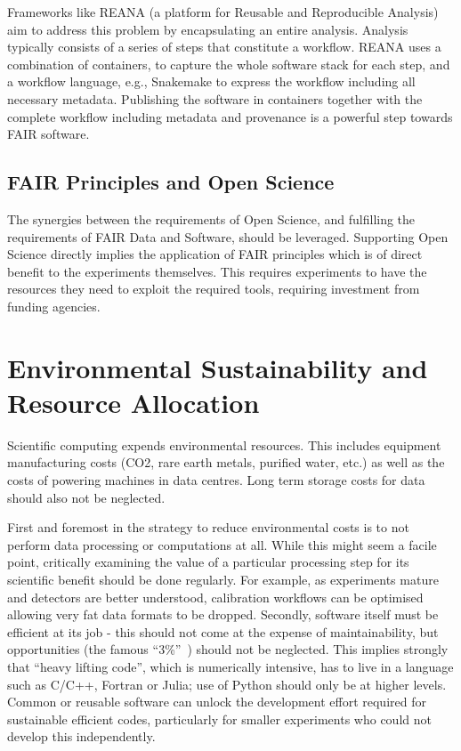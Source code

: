 Frameworks like REANA (a platform for Reusable and Reproducible Analysis) aim to address this problem by encapsulating an entire analysis.  Analysis typically consists of a series of steps that constitute a workflow.  REANA uses a combination of containers, to capture the whole software stack for each step, and a workflow language, e.g., Snakemake to express the workflow including all necessary metadata. Publishing the software in containers together with the complete workflow including metadata and provenance is a powerful step towards FAIR software.

\subsection{FAIR Principles and Open Science}

The synergies between the requirements of Open Science, and fulfilling the requirements of FAIR Data and Software, should be leveraged.  Supporting Open Science directly implies the application of FAIR principles which is of direct benefit to the experiments themselves. This requires experiments to have the resources they need to exploit the required tools, requiring investment from funding agencies.

\section{Environmental Sustainability and Resource Allocation}

Scientific computing expends environmental resources. This includes equipment manufacturing costs (CO2, rare earth metals, purified water, etc.) as well as the costs of powering machines in data centres. Long term storage costs for data should also not be neglected.

First and foremost in the strategy to reduce environmental costs is to not perform data processing or computations at all. While this might seem a facile point, critically examining the value of a particular processing step for its scientific benefit should be done regularly.  For example, as experiments mature and detectors are better understood, calibration workflows can be optimised allowing very fat data formats to be dropped. Secondly, software itself must be efficient at its job - this should not come at the expense of maintainability, but opportunities (the famous ``3\%''~\cite{10.1145/356635.356640}) should not be neglected. This implies strongly that ``heavy lifting code'', which is numerically intensive, has to live in a language such as C/C++, Fortran or Julia; use of Python should only be at higher levels. Common or reusable software can unlock the development effort required for sustainable efficient codes, particularly for smaller experiments who could not develop this independently.

